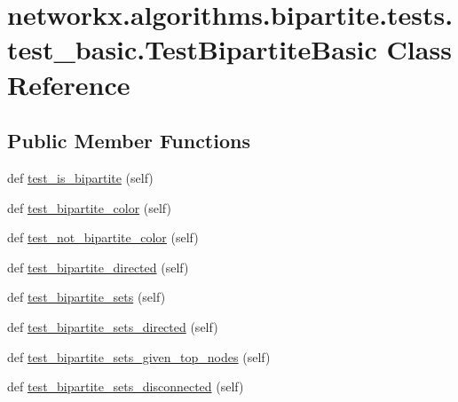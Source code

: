 \hypertarget{classnetworkx_1_1algorithms_1_1bipartite_1_1tests_1_1test__basic_1_1TestBipartiteBasic}{}\section{networkx.\+algorithms.\+bipartite.\+tests.\+test\+\_\+basic.\+Test\+Bipartite\+Basic Class Reference}
\label{classnetworkx_1_1algorithms_1_1bipartite_1_1tests_1_1test__basic_1_1TestBipartiteBasic}
\subsection*{Public Member Functions}
\begin{DoxyCompactItemize}
\item 
def \hyperlink{classnetworkx_1_1algorithms_1_1bipartite_1_1tests_1_1test__basic_1_1TestBipartiteBasic_a0fd775b04a97841f9feb5ee489b5f677}{test\+\_\+is\+\_\+bipartite} (self)
\item 
def \hyperlink{classnetworkx_1_1algorithms_1_1bipartite_1_1tests_1_1test__basic_1_1TestBipartiteBasic_af821775e32064b078345bd18ffdf0047}{test\+\_\+bipartite\+\_\+color} (self)
\item 
def \hyperlink{classnetworkx_1_1algorithms_1_1bipartite_1_1tests_1_1test__basic_1_1TestBipartiteBasic_aa0e706101af17afeb65b4d3ec2adf387}{test\+\_\+not\+\_\+bipartite\+\_\+color} (self)
\item 
def \hyperlink{classnetworkx_1_1algorithms_1_1bipartite_1_1tests_1_1test__basic_1_1TestBipartiteBasic_a0fcd6a8bf8a3eb71226cc180d31a8e77}{test\+\_\+bipartite\+\_\+directed} (self)
\item 
def \hyperlink{classnetworkx_1_1algorithms_1_1bipartite_1_1tests_1_1test__basic_1_1TestBipartiteBasic_a22d95e9e4248c19706caceb518e63189}{test\+\_\+bipartite\+\_\+sets} (self)
\item 
def \hyperlink{classnetworkx_1_1algorithms_1_1bipartite_1_1tests_1_1test__basic_1_1TestBipartiteBasic_a426e8fca3674e9155b38a78c40b5bf37}{test\+\_\+bipartite\+\_\+sets\+\_\+directed} (self)
\item 
def \hyperlink{classnetworkx_1_1algorithms_1_1bipartite_1_1tests_1_1test__basic_1_1TestBipartiteBasic_a35bfbaab363f9c3f6998c7d036ed95fc}{test\+\_\+bipartite\+\_\+sets\+\_\+given\+\_\+top\+\_\+nodes} (self)
\item 
def \hyperlink{classnetworkx_1_1algorithms_1_1bipartite_1_1tests_1_1test__basic_1_1TestBipartiteBasic_ad07517ba4cf9bfcaef097bd0bb77c3a5}{test\+\_\+bipartite\+\_\+sets\+\_\+disconnected} (self)

\end{DoxyCompactItemize}
